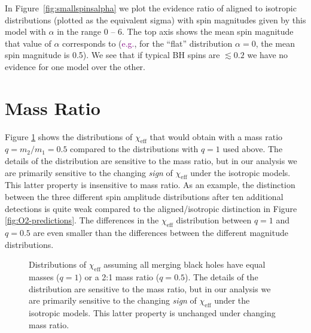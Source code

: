 \documentclass[modern,linenumbers]{aastex61}
\newcommand{\chieff}{\chi_\mathrm{eff}}
\newcommand{\ilya}[1]{\textcolor{purple}{#1}}
\begin{document}
In Figure~\ref{fig:smallspinsalpha} we plot the evidence ratio of aligned to isotropic distributions (plotted as the equivalent sigma) with spin magnitudes given by this model with $\alpha$ in the range $0$ -- $6$. The top axis shows the mean spin magnitude
that value of $\alpha$ corresponds to (\ilya{e.g.}, for the ``flat'' distribution $\alpha = 0$, the mean spin magnitude is 0.5). We see that if typical BH spins are $\lesssim 0.2$ we have no evidence for one model over the other.

\section{Mass Ratio}
\label{sec:mass-ratio}

Figure \ref{fig:mass-ratio-sensitivity} shows the distributions of
$\chieff$ that would obtain with a mass ratio $q = m_2/m_1 = 0.5$
compared to the distributions with $q = 1$ used above.  The details of
the distribution are sensitive to the mass ratio, but in our analysis
we are primarily sensitive to the changing \emph{sign} of $\chieff$
under the isotropic models.  This latter property is insensitive to
mass ratio.  As an example, the distinction between the three
different spin amplitude distributions after ten additional detections
is quite weak compared to the aligned/isotropic distinction in Figure
\ref{fig:O2-predictions}.  The differences in the $\chieff$
distribution between $q = 1$ and $q = 0.5$ are even smaller than the
differences between the different magnitude distributions.

\begin{figure}
  \caption{Distributions of $\chieff$ assuming all merging black holes
    have equal masses ($q=1$) or a 2:1 mass ratio ($q = 0.5$).  The
    details of the distribution are sensitive to the mass ratio, but
    in our analysis we are primarily sensitive to the changing
    \emph{sign} of $\chieff$ under the isotropic models.  This latter
    property is unchanged under changing mass ratio.}
  \label{fig:mass-ratio-sensitivity}
\end{figure}
\end{document}
